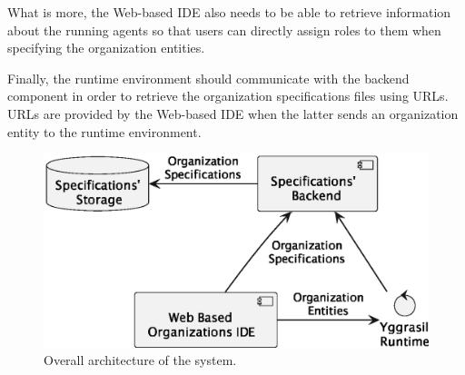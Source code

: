 What is more, the Web-based IDE also needs to be able to retrieve information about the running agents so that users can directly assign roles to them when specifying the organization entities.

Finally, the runtime environment should communicate with the backend component in order to retrieve the organization specifications files using URLs.
URLs are provided by the Web-based IDE when the latter sends an organization entity to the runtime environment.

\begin{figure}
    \centering
    \includegraphics[width=0.8\linewidth]{images/architecture.eps}
    \caption{Overall architecture of the system.}
    \label{fig:architecture}
\end{figure}